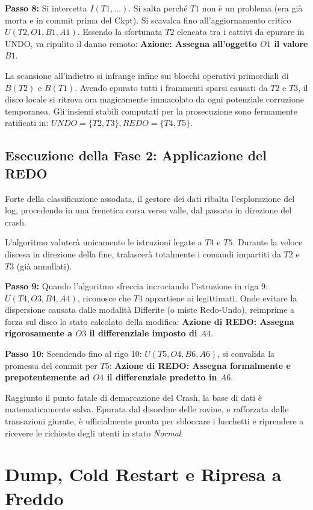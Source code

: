 \textbf{Passo 8:} Si intercetta $I(T1, \dots)$. Si salta perché $T1$ non è un problema (era già morta e in commit prima del Ckpt). Si scavalca fino all'aggiornamento critico $U(T2, O1, B1, A1)$. Essendo la sfortunata $T2$ elencata tra i cattivi da epurare in UNDO, va ripulito il danno remoto: \textbf{Azione: Assegna all'oggetto $O1$ il valore $B1$}.

La scansione all'indietro si infrange infine sui blocchi operativi primordiali di $B(T2)$ e $B(T1)$. Avendo epurato tutti i frammenti sparsi causati da $T2$ e $T3$, il disco locale si ritrova ora magicamente immacolato da ogni potenziale corruzione temporanea. Gli insiemi stabili computati per la prosecuzione sono fermamente ratificati in:
\textbf{$UNDO=\{T2, T3\}, REDO=\{T4, T5\}$}.

\subsection{Esecuzione della Fase 2: Applicazione del REDO}
Forte della classificazione assodata, il gestore dei dati ribalta l'esplorazione del log, procedendo in una frenetica corsa verso valle, dal passato in direzione del crash.

L'algoritmo valuterà unicamente le istruzioni legate a $T4$ e $T5$.
Durante la veloce discesa in direzione della fine, tralascerà totalmente i comandi impartiti da $T2$ e $T3$ (già annullati).

\textbf{Passo 9:} Quando l'algoritmo sfreccia incrociando l'istruzione in riga 9: $U(T4, O3, B4, A4)$, riconosce che $T4$ appartiene ai legittimati. Onde evitare la dispersione causata dalle modalità Differite (o miste Redo-Undo), reimprime a forza sul disco lo stato calcolato della modifica: \textbf{Azione di REDO: Assegna rigorosamente a $O3$ il differenziale imposto di $A4$}.

\textbf{Passo 10:} Scendendo fino al rigo 10: $U(T5, O4, B6, A6)$, si convalida la promessa del commit per $T5$: \textbf{Azione di REDO: Assegna formalmente e prepotentemente ad $O4$ il differenziale predetto in $A6$}.

Raggiunto il punto fatale di demarcazione del Crash, la base di dati è matematicamente salva. Epurata dal disordine delle rovine, e rafforzata dalle transazioni giurate, è ufficialmente pronta per sbloccare i lucchetti e riprendere a ricevere le richieste degli utenti in stato \textit{Normal}.

\section{Dump, Cold Restart e Ripresa a Freddo}

